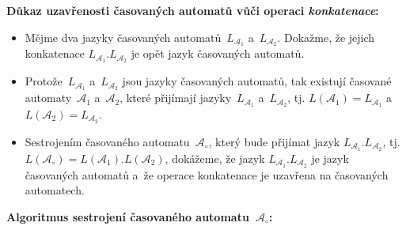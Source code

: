 \documentclass[a4paper, 11pt]{scrartcl}
\begin{document}
    \textbf{Důkaz uzavřenosti časovaných automatů vůči operaci
    \emph{konkatenace}:}
    \begin{itemize}
        \item
            Mějme dva jazyky časovaných automatů~$ L_{\mathcal{A}_1} $
            a~$ L_{\mathcal{A}_2} $. Dokažme, že jejich konkatenace
            $ L_{\mathcal{A}_1} . L_{\mathcal{A}_2} $ je opět jazyk
            časovaných automatů.

        \item
            Protože~$ L_{\mathcal{A}_1} $ a~$ L_{\mathcal{A}_2} $ jsou
            jazyky časovaných automatů, tak existují časované
            automaty~$ \mathcal{A}_1 $ a~$ \mathcal{A}_2 $, které přijímají
            jazyky~$ L_{\mathcal{A}_1} $ a~$ L_{\mathcal{A}_2} $, tj.
            $ L(\mathcal{A}_1) = L_{\mathcal{A}_1} $ a~$ L(\mathcal{A}_2) =
            L_{\mathcal{A}_2} $.

        \item
            Sestrojením časovaného automatu~$ \mathcal{A}_\circ $, který bude
            přijímat jazyk $ L_{\mathcal{A}_1} . L_{\mathcal{A}_2} $, tj.
            $ L(\mathcal{A}_\circ) = L(\mathcal{A}_1) . L(\mathcal{A}_2) $,
            dokážeme, že jazyk $ L_{\mathcal{A}_1} . L_{\mathcal{A}_2} $
            je jazyk časovaných automatů a~že operace konkatenace je uzavřena
            na časovaných automatech.
    \end{itemize}
    \vspace{-5pt}
    \textbf{Algoritmus sestrojení časovaného automatu~$ \boldsymbol{\mathcal{
    A}_\circ} $:}
\end{document}
